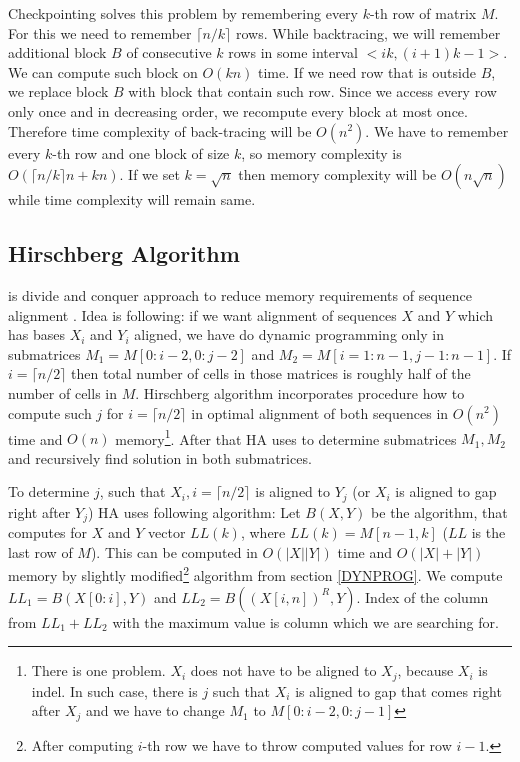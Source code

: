 Checkpointing solves this problem by remembering every $k$-th row of matrix $M$.
For this we need to remember $\lceil n/k\rceil$ rows.
While backtracing, we will remember additional block $B$ of consecutive $k$ rows in
some interval $<ik,(i+1)k-1>$. We can compute such block on $O(kn)$ time. 
If we need row that is outside $B$, we replace block $B$ with block that contain
such row. Since we access every row only once and in decreasing order, we
recompute every block at most once. Therefore time complexity of back-tracing
will be $O(n^2)$. We have to remember every $k$-th row and one block of size
$k$, so memory complexity is $O(\lceil n/k\rceil n+ kn)$. If we set $k=\sqrt n$
then memory complexity will be $O(n\sqrt n)$ while time complexity will remain
same.


\subsection{Hirschberg Algorithm}

 is divide and conquer approach to reduce
memory requirements of sequence alignment \cite{Hirschberg1975}. Idea is
following: if we want alignment of sequences $X$ and $Y$ which has bases $X_i$
and $Y_i$ aligned, we have do dynamic programming only in submatrices
$M_1=M[0:i-2,0:j-2]$ and $M_2=M[i=1:n-1,j-1:n-1]$. If $i=\lceil n/2\rceil$ then
total number of cells in those matrices is roughly half of the number of cells
in $M$. Hirschberg algorithm incorporates procedure how to compute such $j$ for
$i=\lceil n/2\rceil$ in optimal alignment of both sequences in $O(n^2)$ time and
$O(n)$ memory\footnote{There is one problem. $X_i$ does not have to be aligned
to $X_j$, because $X_i$ is indel. In such case, there is $j$ such that $X_i$ is
aligned to gap that comes right after $X_j$ and we have to change $M_1$ to
$M[0:i-2,0:j-1]$}. After that HA uses to determine submatrices $M_1,M_2$ and
recursively find solution in both submatrices.

To determine $j$, such that $X_i,i=\lceil n/2\rceil$ is aligned to $Y_j$ (or
$X_i$ is aligned to gap right after $Y_j$) HA uses following algorithm: Let
$B(X,Y)$ be the algorithm, that computes for $X$ and $Y$ vector $LL(k)$, where
$LL(k)=M[n-1,k]$ ($LL$ is the last row of $M$). This can be computed in
$O(|X||Y|)$ time and $O(|X|+|Y|)$ memory by slightly modified\footnote{After
computing $i$-th row we have to throw computed values for row $i-1$.} algorithm
from section \ref{DYNPROG}.  We compute $LL_1=B(X[0:i],Y)$ and $LL_2=B(
(X[i,n])^R,Y)$. Index of the column from $LL_1+LL_2$ with the maximum value is
column which we are searching for. 

